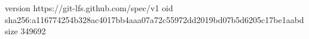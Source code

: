 version https://git-lfs.github.com/spec/v1
oid sha256:a116774254b328ac4017bb4aaa07a72c55972dd2019bd07b5d6205c17be1aabd
size 349692
